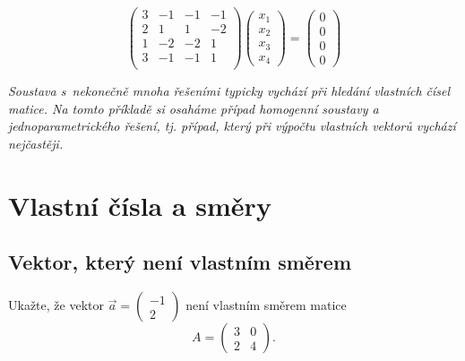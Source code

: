 \begin{equation*}
  \begin{pmatrix}
3 &-1 &-1 &-1\\ 
2 &1 &1 &-2 \\
1 &-2 &-2 &1 \\
3 &-1 &-1 &1 \\
\end{pmatrix}
\begin{pmatrix}
  x_1 \\ x_2 \\x_3\\x_4
\end{pmatrix}
=
\begin{pmatrix}
  0 \\ 0 \\0\\0
\end{pmatrix}
\end{equation*}

\textit{Soustava s nekonečně mnoha řešeními typicky vychází při
  hledání vlastních čísel matice. Na tomto příkladě si osaháme případ
  homogenní soustavy a jednoparametrického řešení, tj. případ, který
  při výpočtu vlastních vektorů vychází nejčastěji.}







\stranka
\section{Vlastní čísla a směry}

\subsection{Vektor, který není vlastním směrem}

Ukažte, že vektor $\vec a=
  \begin{pmatrix}
    -1\\2
  \end{pmatrix}
  $
není vlastním směrem matice $$A=\begin{pmatrix}  3& 0 \\ 2 &4\end{pmatrix}.$$

